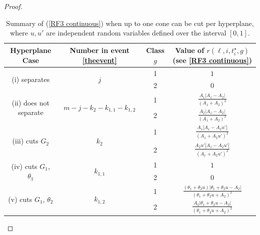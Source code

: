 \documentclass[twoside,11pt]{article}
\newcommand{\edit}[1]{{{#1}}}
\begin{document}
\begin{proof}
\begin{table}[!htbp]
\centering
\begin{tabular}{| c | c |c | c |}
\hline
Hyperplane Case & Number in event \eqref{theevent} & Class $g$ & Value of $r(\ell,i,t_i^\star,g)$ (see \eqref{RF3 continuous})\\ 
\hline
\hline
\multirow{2}{*}{(i) separates} & \multirow{2}{*}{$j$} & 1 & $1$\\ 
 & & 2 & $0$\\ 
\hline
\hline
\multirow{2}{*}{(ii) does not separate} & \multirow{2}{*}{$m - j - k_2 - k_{1,1} - k_{1,2}$}  &  1 & $\frac{A_1|A_1-A_2|}{(A_1+A_2)^2}$ \\ 
&& 2 & $\frac{A_2|A_1-A_2|}{(A_1+A_2)^2}$\\ 
\hline
\hline
\multirow{2}{*}{(iii) cuts $G_2$} & \multirow{2}{*}{$k_2$} &  1 & $\frac{A_1|A_1-A_2u'|}{(A_1+A_2u')^2}$\\ 
&& 2 & $\frac{A_2 u'|A_1-A_2u'|}{(A_1+A_2u')^2}$\\ 
\hline
\hline
\multirow{2}{*}{(iv) cuts $G_1$, $\theta_1$}& \multirow{2}{*}{$k_{1,1}$} & 1 & $1$\\ 
&& 2 & $0$\\ 
\hline
\hline
\multirow{2}{*}{(v) cuts $G_1$, $\theta_2$} & \multirow{2}{*}{$k_{1,2}$} & 1 & $\frac{(\theta_1+\theta_2u)|\theta_1+\theta_2u-A_2|}{(\theta_1+\theta_2u+A_2)^2}$ \\ 
&& 2 & $\frac{A_2|\theta_1+\theta_2u-A_2|}{(\theta_1+\theta_2u+A_2)^2}$ \\ 
\hline
\end{tabular}
\caption{Summary of (\ref{RF3 continuous}) when up to one cone can be cut per hyperplane, where $ u, u'$ \edit{are independent random variables defined over the interval $[0,1]$}.}
\label{table::redness factors for 2d cones}
\end{table}


\end{proof}
\end{document}
